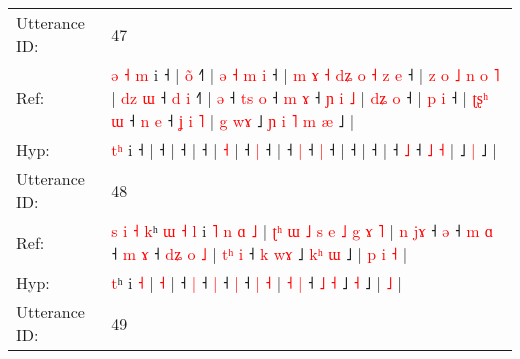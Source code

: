 \documentclass[10pt]{article}
\DeclareRobustCommand{\hl}[1]{{\textcolor{red}{#1}}}
\begin{document}
\begin{longtable}{ll}
 \\
\midrule
Utterance ID: & 47 \\
Ref: & \hl{ə}\hl{ }\hl{˧}\hl{ }\hl{m} i ˧ |\hl{ }\hl{o}\hl{̃} ˧\hl{˥} |\hl{ }\hl{ə}\hl{ }\hl{˧}\hl{ }\hl{m}\hl{ }\hl{i} ˧ |\hl{ }\hl{m}\hl{ }\hl{ɤ}\hl{ }\hl{˧}\hl{ }\hl{d}\hl{ʑ}\hl{ }\hl{o}\hl{ }\hl{˧}\hl{ }\hl{z}\hl{ }\hl{e} ˧ |\hl{ }\hl{z}\hl{ }\hl{o}\hl{ }\hl{˩}\hl{ }\hl{n}\hl{ }\hl{o} \hl{˥} |\hl{ }\hl{d}\hl{z}\hl{ }\hl{ɯ} ˧\hl{ }\hl{d} \hl{i} ˧\hl{˥} |\hl{ }\hl{ə} ˧\hl{ }\hl{t}\hl{s} \hl{o} ˧\hl{ }\hl{m} \hl{ɤ} ˧\hl{ }\hl{ɲ}\hl{ }\hl{i}\hl{ }\hl{˩} |\hl{ }\hl{d}\hl{ʑ}\hl{ }\hl{o} ˧ |\hl{ }\hl{p}\hl{ }\hl{i} ˧ |\hl{ }\hl{ʈ}\hl{ʂ}\hl{ʰ}\hl{ }\hl{ɯ} ˧\hl{ }\hl{n} \hl{e} ˧\hl{ }\hl{ʝ} \hl{i} \hl{˥} |\hl{ }\hl{g}\hl{ }\hl{w}\hl{ɤ} ˩\hl{ }\hl{ɲ}\hl{ }\hl{i}\hl{ }\hl{˥}\hl{ }\hl{m} \hl{æ} ˩ |
 \\
Hyp: & \hl{}\hl{}\hl{}\hl{t}\hl{ʰ} i ˧ |\hl{}\hl{}\hl{} ˧\hl{} |\hl{}\hl{}\hl{}\hl{}\hl{}\hl{}\hl{}\hl{} ˧ |\hl{}\hl{}\hl{}\hl{}\hl{}\hl{}\hl{}\hl{}\hl{}\hl{}\hl{}\hl{}\hl{}\hl{}\hl{}\hl{}\hl{} ˧ |\hl{}\hl{}\hl{}\hl{}\hl{}\hl{}\hl{}\hl{}\hl{}\hl{} \hl{˧} |\hl{}\hl{}\hl{}\hl{}\hl{} ˧\hl{}\hl{} \hl{|} ˧\hl{} |\hl{}\hl{} ˧\hl{}\hl{}\hl{} \hl{|} ˧\hl{}\hl{} \hl{|} ˧\hl{}\hl{}\hl{}\hl{}\hl{}\hl{} |\hl{}\hl{}\hl{}\hl{}\hl{} ˧ |\hl{}\hl{}\hl{}\hl{} ˧ |\hl{}\hl{}\hl{}\hl{}\hl{}\hl{} ˧\hl{}\hl{} \hl{˩} ˧\hl{}\hl{} \hl{˩} \hl{˧} |\hl{}\hl{}\hl{}\hl{}\hl{} ˩\hl{}\hl{}\hl{}\hl{}\hl{}\hl{}\hl{}\hl{} \hl{|} ˩ |
 \\
\midrule
Utterance ID: & 48 \\
Ref: & \hl{s}\hl{ }\hl{i}\hl{ }\hl{˧}\hl{ }\hl{k}ʰ\hl{ }\hl{ɯ}\hl{ }\hl{˧}\hl{ }\hl{l} i\hl{ }\hl{˥}\hl{ }\hl{n}\hl{ }\hl{ɑ} \hl{˩} |\hl{ }\hl{ʈ}\hl{ʰ}\hl{ }\hl{ɯ}\hl{ }\hl{˩}\hl{ }\hl{s}\hl{ }\hl{e}\hl{ }\hl{˩}\hl{ }\hl{g}\hl{ }\hl{ɤ} \hl{˥} |\hl{ }\hl{n}\hl{ }\hl{j}\hl{ɤ} ˧ \hl{ə} ˧\hl{ }\hl{m} \hl{ɑ} ˧\hl{ }\hl{m} \hl{ɤ} ˧\hl{ }\hl{d}\hl{ʑ} \hl{o} \hl{˩} | \hl{t}\hl{ʰ} \hl{i} ˧ \hl{k} \hl{w}\hl{ɤ} ˩\hl{ }\hl{k}\hl{ʰ} \hl{ɯ} ˩ |\hl{ }\hl{p}\hl{ }\hl{i} \hl{˧} |
 \\
Hyp: & \hl{}\hl{}\hl{}\hl{}\hl{}\hl{}\hl{t}ʰ\hl{}\hl{}\hl{}\hl{}\hl{}\hl{} i\hl{}\hl{}\hl{}\hl{}\hl{}\hl{} \hl{˧} |\hl{}\hl{}\hl{}\hl{}\hl{}\hl{}\hl{}\hl{}\hl{}\hl{}\hl{}\hl{}\hl{}\hl{}\hl{}\hl{}\hl{} \hl{˧} |\hl{}\hl{}\hl{}\hl{}\hl{} ˧ \hl{|} ˧\hl{}\hl{} \hl{|} ˧\hl{}\hl{} \hl{|} ˧\hl{}\hl{}\hl{} \hl{|} \hl{˧} | \hl{}\hl{˧} \hl{|} ˧ \hl{˩} \hl{}\hl{˧} ˩\hl{}\hl{}\hl{} \hl{˧} ˩ |\hl{}\hl{}\hl{}\hl{} \hl{˩} |
 \\
\midrule
Utterance ID: & 49 \\

\end{longtable}
\end{document}
